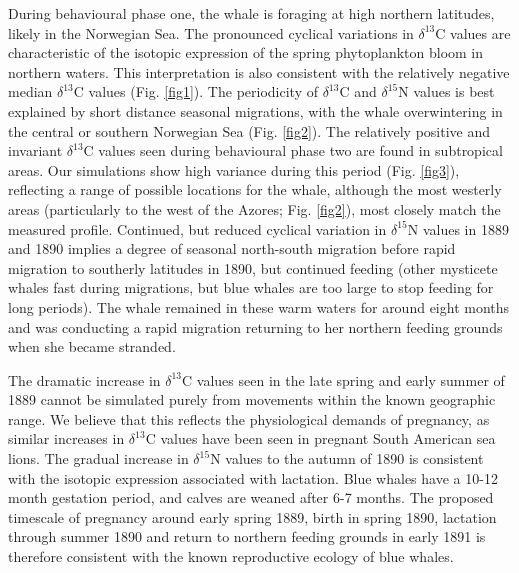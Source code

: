 \documentclass[a4paper,12pt]{article}
\begin{document}
During behavioural phase one, the whale is foraging at high northern latitudes, likely in the Norwegian Sea. 
The pronounced cyclical variations in $\delta^{13}$C values are characteristic of the isotopic expression of the spring phytoplankton bloom in northern waters\cite{magozzi2017using}. 
This interpretation is also consistent with the relatively negative median $\delta^{13}$C values (Fig. \ref{fig1}). 
The periodicity of $\delta^{13}$C and $\delta^{15}$N values is best explained by short distance seasonal migrations, with the whale overwintering in the central or southern Norwegian Sea (Fig. \ref{fig2}). 
The relatively positive and invariant $\delta^{13}$C values seen during behavioural phase two are found in subtropical areas.
Our simulations show high variance during this period (Fig. \ref{fig3}), reflecting a range of possible locations for the whale, although the most westerly areas (particularly to the west of the Azores; Fig. \ref{fig2}), most closely match the measured profile. 
Continued, but reduced cyclical variation in $\delta^{15}$N values in 1889 and 1890 implies a degree of seasonal north-south migration before rapid migration to southerly latitudes in 1890, but continued feeding (other mysticete whales fast during migrations, but blue whales are too large to stop feeding for long periods\cite{busquets2017estimating,silva2013north}). 
The whale remained in these warm waters for around eight months and was conducting a rapid migration returning to her northern feeding grounds when she became stranded. 
 
The dramatic increase in $\delta^{13}$C values seen in the late spring and early summer of 1889 cannot be simulated purely from movements within the known geographic range.
We believe that this reflects the physiological demands of pregnancy, as similar increases in $\delta^{13}$C values have been seen in pregnant South American sea lions\cite{cardona2017temporal}. 
The gradual increase in $\delta^{15}$N values to the autumn of 1890 is consistent with the isotopic expression associated with lactation\cite{cardona2017temporal}. 
Blue whales have a 10-12 month gestation period, and calves are weaned after 6-7 months\cite{handbook}. 
The proposed timescale of pregnancy around early spring 1889, birth in spring 1890, lactation through summer 1890 and return to northern feeding grounds in early 1891 is therefore consistent with the known reproductive ecology of blue whales. 
 
\end{document}
